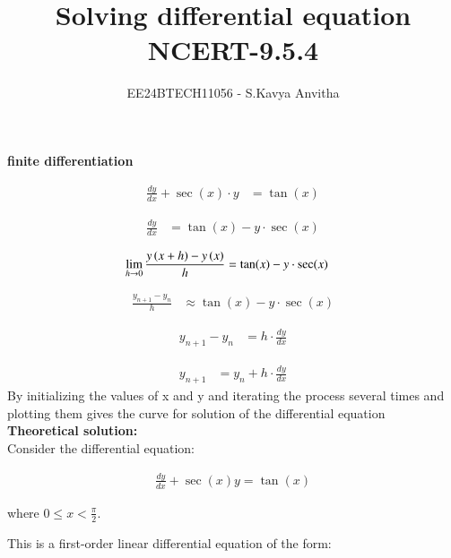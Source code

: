 \documentclass[journal]{IEEEtran}
\begin{document}

\vspace{3cm}

\title{Solving differential equation\\NCERT-9.5.4}
\author{EE24BTECH11056 - S.Kavya Anvitha}
\maketitle
\bigskip

\renewcommand{\thefigure}{\theenumi}
\renewcommand{\thetable}{\theenumi}
\textbf{finite differentiation}

\begin{align*}
\frac{dy}{dx} + \sec(x) \cdot y &= \tan(x)
\end{align*}

\begin{align*}
\frac{dy}{dx} &= \tan(x) - y \cdot \sec(x)
\end{align*}

\begin{align*}
\lim_{h \to 0} \frac{y\left(x+h\right) - y\left(x\right)}{h} &= \tan(x) - y \cdot \sec(x)
\end{align*}

\begin{align*}
\frac{y_{n+1} - y_n}{h} &\approx \tan(x) - y \cdot \sec(x)
\end{align*}

\begin{align*}
y_{n+1} - y_n &= h \cdot \frac{dy}{dx}
\end{align*}

\begin{align*}
y_{n+1} &= y_n + h \cdot \frac{dy}{dx}
\end{align*}
By initializing the values of x and y and iterating the process several times 
and plotting them gives the curve for solution of the differential equation\\

\textbf{Theoretical solution:}\\
Consider the differential equation:

\begin{align*}
\frac{dy}{dx} + \sec(x)y = \tan(x)
\end{align*}

where $0 \leq x < \frac{\pi}{2}$.

This is a first-order linear differential equation of the form:
\end{document}
